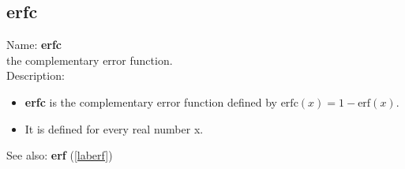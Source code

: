 \subsection{erfc}
\label{laberfc}
\noindent Name: \textbf{erfc}\\
the complementary error function.\\

\noindent Description: \begin{itemize}

\item \textbf{erfc} is the complementary error function defined by $\mathrm{erfc}(x) = 1 - \mathrm{erf}(x)$.

\item It is defined for every real number x.
\end{itemize}
See also: \textbf{erf} (\ref{laberf})
